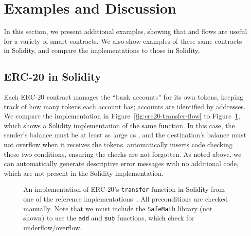 \documentclass[dvipsnames,runningheads]{llncs}
\begin{document}
\section{Examples and Discussion}

In this section, we present additional examples, showing that \langName and flows are useful for a variety of smart contracts.
We also show examples of these same contracts in Solidity, and compare the \langName implementations to those in Solidity.

\subsection{ERC-20 in Solidity}\label{sec:erc20-impl}
Each ERC-20 contract manages the ``bank accounts'' for its own tokens, keeping track of how many tokens each account has; accounts are identified by addresses.
We compare the \langName implementation in Figure~\ref{fig:erc20-transfer-flow} to Figure~\ref{fig:erc20-transfer-sol}, which shows a Solidity implementation of the same function.
In this case, the sender's balance must be at least as large as , and the destination's balance must not overflow when it receives the tokens.
\langName automatically inserts code checking these two conditions, ensuring the checks are not forgotten.
As noted above, we can automatically generate descriptive error messages with no additional code, which are not present in the Solidity implementation.
\begin{figure}
    \vspace{-2em}
    \centering
    
    \vspace{-1em}
    \caption{An implementation of ERC-20's \lstinline{transfer} function in Solidity from one of the reference implementations~\cite{erc20Consensys}.
        All preconditions are checked manually.
        Note that we must include the \lstinline{SafeMath} library (not shown) to use the \lstinline{add} and \lstinline{sub} functions, which check for underflow/overflow.}
    \label{fig:erc20-transfer-sol}
    \vspace{-2em}
\end{figure}
\end{document}
